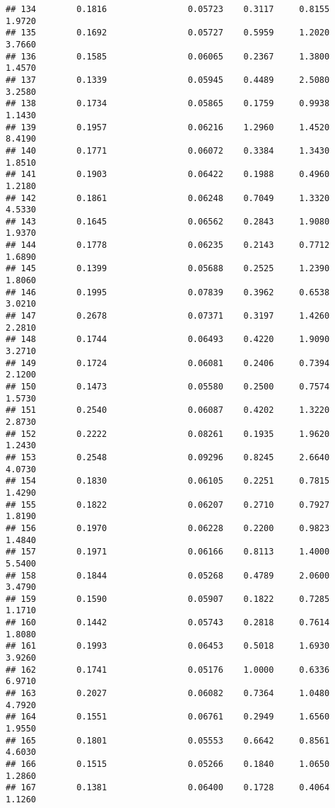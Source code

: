 \documentclass[
]{article}
\begin{document}
\begin{verbatim}
## 134        0.1816                0.05723    0.3117     0.8155       1.9720
## 135        0.1692                0.05727    0.5959     1.2020       3.7660
## 136        0.1585                0.06065    0.2367     1.3800       1.4570
## 137        0.1339                0.05945    0.4489     2.5080       3.2580
## 138        0.1734                0.05865    0.1759     0.9938       1.1430
## 139        0.1957                0.06216    1.2960     1.4520       8.4190
## 140        0.1771                0.06072    0.3384     1.3430       1.8510
## 141        0.1903                0.06422    0.1988     0.4960       1.2180
## 142        0.1861                0.06248    0.7049     1.3320       4.5330
## 143        0.1645                0.06562    0.2843     1.9080       1.9370
## 144        0.1778                0.06235    0.2143     0.7712       1.6890
## 145        0.1399                0.05688    0.2525     1.2390       1.8060
## 146        0.1995                0.07839    0.3962     0.6538       3.0210
## 147        0.2678                0.07371    0.3197     1.4260       2.2810
## 148        0.1744                0.06493    0.4220     1.9090       3.2710
## 149        0.1724                0.06081    0.2406     0.7394       2.1200
## 150        0.1473                0.05580    0.2500     0.7574       1.5730
## 151        0.2540                0.06087    0.4202     1.3220       2.8730
## 152        0.2222                0.08261    0.1935     1.9620       1.2430
## 153        0.2548                0.09296    0.8245     2.6640       4.0730
## 154        0.1830                0.06105    0.2251     0.7815       1.4290
## 155        0.1822                0.06207    0.2710     0.7927       1.8190
## 156        0.1970                0.06228    0.2200     0.9823       1.4840
## 157        0.1971                0.06166    0.8113     1.4000       5.5400
## 158        0.1844                0.05268    0.4789     2.0600       3.4790
## 159        0.1590                0.05907    0.1822     0.7285       1.1710
## 160        0.1442                0.05743    0.2818     0.7614       1.8080
## 161        0.1993                0.06453    0.5018     1.6930       3.9260
## 162        0.1741                0.05176    1.0000     0.6336       6.9710
## 163        0.2027                0.06082    0.7364     1.0480       4.7920
## 164        0.1551                0.06761    0.2949     1.6560       1.9550
## 165        0.1801                0.05553    0.6642     0.8561       4.6030
## 166        0.1515                0.05266    0.1840     1.0650       1.2860
## 167        0.1381                0.06400    0.1728     0.4064       1.1260

\end{verbatim}
\end{document}

